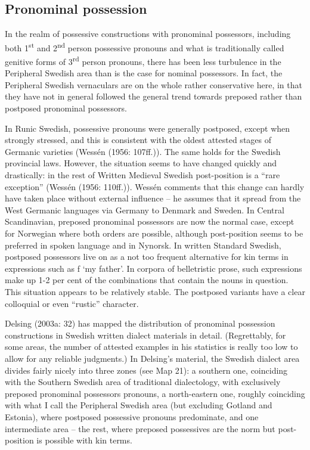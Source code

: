 \subsection[Pronominal possession]{\rmfamily Pronominal possession}
In the realm of possessive constructions with pronominal possessors, including both 1\textsuperscript{st} and 2\textsuperscript{nd} person possessive pronouns and what is traditionally called genitive forms of 3\textsuperscript{rd} person pronouns, there has been less turbulence in the Peripheral Swedish area than is the case for nominal possessors. In fact, the Peripheral Swedish vernaculars are on the whole rather conservative here, in that they have not in general followed the general trend towards preposed rather than postposed pronominal possessors. 

In Runic Swedish, possessive pronouns were generally postposed, except when strongly stressed, and this is consistent with the oldest attested stages of Germanic varieties (Wessén (1956: 107ff.)). The same holds for the Swedish provincial laws. However, the situation seems to have changed quickly and drastically: in the rest of Written Medieval Swedish post-position is a “rare exception” (Wessén (1956: 110ff.)). Wessén comments that this change can hardly have taken place without external influence – he assumes that it spread from the West Germanic languages via Germany to Denmark and Sweden. In Central Scandinavian, preposed pronominal possessors are now the normal case, except for Norwegian where both orders are possible, although post-position seems to be preferred in spoken language and in Nynorsk. In written Standard Swedish, postposed possessors live on as a not too frequent alternative for kin terms in expressions such as f ‘my father’. In corpora of belletristic prose, such expressions make up 1-2 per cent of the combinations that contain the nouns in question. This situation appears to be relatively stable. The postposed variants have a clear colloquial or even “rustic” character. 

Delsing (2003a: 32) has mapped the distribution of pronominal possession constructions in Swedish written dialect materials in detail. (Regrettably, for some areas, the number of attested examples in his statistics is really too low to allow for any reliable judgments.) In Delsing’s material, the Swedish dialect area divides fairly nicely into three zones (see Map 21): a southern one, coinciding with the Southern Swedish area of traditional dialectology, with exclusively preposed pronominal possessors pronouns, a north-eastern one, roughly coinciding with what I call the Peripheral Swedish area (but excluding Gotland and Estonia), where postposed possessive pronouns predominate, and one intermediate area – the rest, where preposed possessives are the norm but post-position is possible with kin terms.

